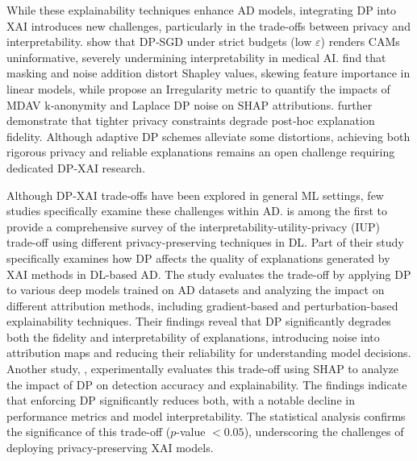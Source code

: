 While these explainability techniques enhance AD models, integrating DP into XAI introduces new challenges, particularly in the trade-offs between privacy and interpretability. \cite{naidu2021differential} show that DP‑SGD under strict budgets (low $\varepsilon$) renders CAMs uninformative, severely undermining interpretability in medical AI. \cite{bozorgpanah2022privacy} find that masking and noise addition distort Shapley values, skewing feature importance in linear models, while \cite{bozorgpanah2024explainable} propose an Irregularity metric to quantify the impacts of MDAV k‑anonymity and Laplace DP noise on SHAP attributions. \cite{patel2022model} further demonstrate that tighter privacy constraints degrade post‑hoc explanation fidelity. Although adaptive DP schemes alleviate some distortions, achieving both rigorous privacy and reliable explanations remains an open challenge requiring dedicated DP‑XAI research.

Although DP‑XAI trade‑offs have been explored in general ML settings, few studies specifically examine these challenges within AD. \cite{saifullah2022privacy} is among the first to provide a comprehensive survey of the interpretability-utility-privacy (IUP) trade-off using different privacy-preserving techniques in DL. Part of their study specifically examines how DP affects the quality of explanations generated by XAI methods in DL-based AD. The study evaluates the trade-off by applying DP to various deep models trained on AD datasets and analyzing the impact on different attribution methods, including gradient-based and perturbation-based explainability techniques. Their findings reveal that DP significantly degrades both the fidelity and interpretability of explanations, introducing noise into attribution maps and reducing their reliability for understanding model decisions. Another study, \cite{ezzeddine2024differential}, experimentally evaluates this trade-off using SHAP to analyze the impact of DP on detection accuracy and explainability. The findings indicate that enforcing DP significantly reduces both, with a notable decline in performance metrics and model interpretability. The statistical analysis confirms the significance of this trade-off ($p$-value $< 0.05$), underscoring the challenges of deploying privacy-preserving XAI models.

